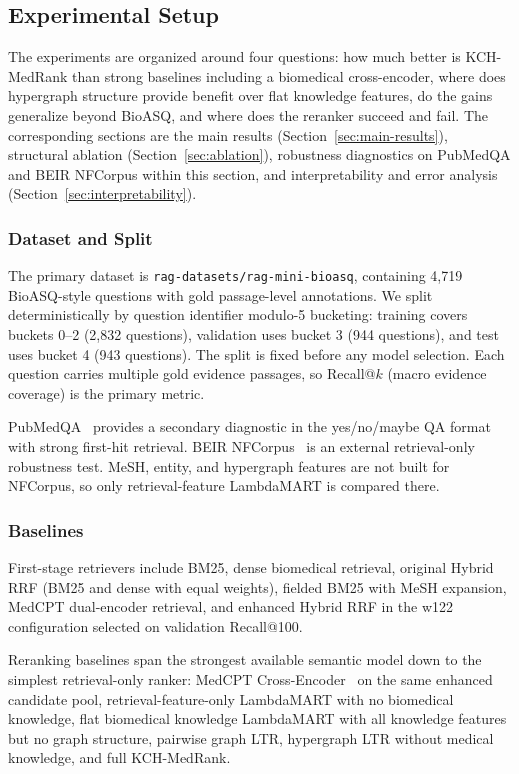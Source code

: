 \subsection{Experimental Setup}

The experiments are organized around four questions: how much better is KCH-MedRank than strong baselines including a biomedical cross-encoder, where does hypergraph structure provide benefit over flat knowledge features, do the gains generalize beyond BioASQ, and where does the reranker succeed and fail. The corresponding sections are the main results (Section~\ref{sec:main-results}), structural ablation (Section~\ref{sec:ablation}), robustness diagnostics on PubMedQA and BEIR NFCorpus within this section, and interpretability and error analysis (Section~\ref{sec:interpretability}).

\subsubsection{Dataset and Split}

The primary dataset is \texttt{rag-datasets/rag-mini-bioasq}, containing 4,719 BioASQ-style questions with gold passage-level annotations. We split deterministically by question identifier modulo-5 bucketing: training covers buckets 0--2 (2,832 questions), validation uses bucket 3 (944 questions), and test uses bucket 4 (943 questions). The split is fixed before any model selection. Each question carries multiple gold evidence passages, so Recall@$k$ (macro evidence coverage) is the primary metric.

PubMedQA~\citep{jin2019pubmedqa} provides a secondary diagnostic in the yes/no/maybe QA format with strong first-hit retrieval. BEIR NFCorpus~\citep{thakur2021beir} is an external retrieval-only robustness test. MeSH, entity, and hypergraph features are not built for NFCorpus, so only retrieval-feature LambdaMART is compared there.

\subsubsection{Baselines}

First-stage retrievers include BM25, dense biomedical retrieval, original Hybrid RRF (BM25 and dense with equal weights), fielded BM25 with MeSH expansion, MedCPT dual-encoder retrieval, and enhanced Hybrid RRF in the w122 configuration selected on validation Recall@100.

Reranking baselines span the strongest available semantic model down to the simplest retrieval-only ranker: MedCPT Cross-Encoder~\citep{jin2023medcpt} on the same enhanced candidate pool, retrieval-feature-only LambdaMART with no biomedical knowledge, flat biomedical knowledge LambdaMART with all knowledge features but no graph structure, pairwise graph LTR, hypergraph LTR without medical knowledge, and full KCH-MedRank.

